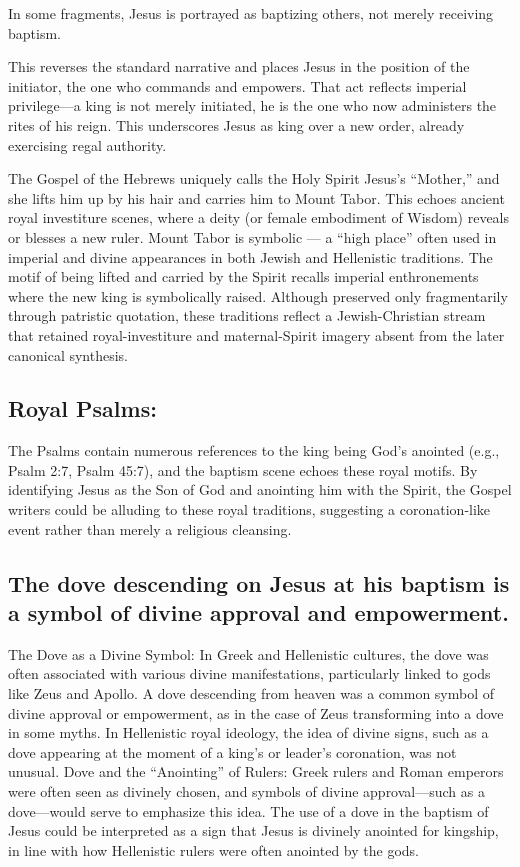 In some fragments, Jesus is portrayed as baptizing others, not merely receiving baptism.

This reverses the standard narrative and places Jesus in the position of the initiator, the one who commands and empowers.
That act reflects imperial privilege---a king is not merely initiated, he is the one who now administers the rites of his reign.
This underscores Jesus as king over a new order, already exercising regal authority.

The Gospel of the Hebrews \cite{gospelhebrews} uniquely calls the Holy Spirit Jesus's ``Mother,'' and she lifts him up by his hair and carries him to Mount Tabor.
This echoes ancient royal investiture scenes, where a deity (or female embodiment of Wisdom) reveals or blesses a new ruler.
Mount Tabor is symbolic --- a ``high place'' often used in imperial and divine appearances in both Jewish and Hellenistic traditions.
The motif of being lifted and carried by the Spirit recalls imperial enthronements where the new king is symbolically raised.
Although preserved only fragmentarily through patristic quotation, these traditions reflect a Jewish-Christian stream that retained royal-investiture and maternal-Spirit imagery absent from the later canonical synthesis.

\subsection{Royal Psalms:}\label{par:royal-psalms}

The Psalms contain numerous references to the king being God's anointed (e.g., Psalm 2:7, Psalm 45:7), and the baptism scene echoes these royal motifs.
By identifying Jesus as the Son of God and anointing him with the Spirit, the Gospel writers could be alluding to these royal traditions, suggesting a coronation-like event rather than merely a religious cleansing.

\subsection{The dove descending on Jesus at his baptism is a symbol of divine approval and empowerment.}\label{subsec:the-dove-descending-on-jesus-at-his-baptism-is-a-symbol-of-divine-approval-and-empowerment.}

The Dove as a Divine Symbol: In Greek and Hellenistic cultures, the dove was often associated with various divine manifestations, particularly linked to gods like Zeus and Apollo.
A dove descending from heaven was a common symbol of divine approval or empowerment, as in the case of Zeus transforming into a dove in some myths.
In Hellenistic royal ideology, the idea of divine signs, such as a dove appearing at the moment of a king's or leader's coronation, was not unusual.
Dove and the ``Anointing'' of Rulers: Greek rulers and Roman emperors were often seen as divinely chosen, and symbols of divine approval---such as a dove---would serve to emphasize this idea.
The use of a dove in the baptism of Jesus could be interpreted as a sign that Jesus is divinely anointed for kingship, in line with how Hellenistic rulers were often anointed by the gods.

